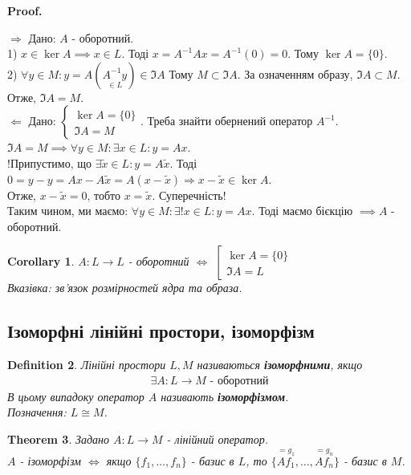 \documentclass[a4paper, 10pt]{article}
\makeatletter
\def\rightproof{$\boxed{\Rightarrow}$ }
\def\leftproof{$\boxed{\Leftarrow}$ }
\theoremstyle{theoremdd}
\newtheorem{theorem}{Theorem}[subsection]
\newtheorem{definition}[theorem]{Definition}
\newtheorem{corollary}[theorem]{Corollary}
\renewenvironment{proof}[1][Proof.\\]{\par
\pushQED{\hfill \qed}%
\normalfont \topsep6\p@\@plus6\p@\relax
\trivlist
\item\relax
{\bfseries
#1\@addpunct{.}}\hspace\labelsep\ignorespaces
}{%
\popQED\endtrivlist\@endpefalse
}
\makeatother
\begin{document}
	\begin{proof}
	\rightproof Дано: $A$ - оборотний.\\
	1) $x \in \ker A \implies x \in L$. Тоді $x = A^{-1}Ax = A^{-1}(0) = 0$. Тому $\ker A = \{0\}$.\\
	2) $\forall y \in M: y = A(\underset{\in L}{A^{-1}y}) \in \Im A$ Тому $M \subset \Im A$. За означенням образу, $\Im A \subset M$. Отже, $\Im A = M$.
	\bigskip \\
	\leftproof Дано: $\begin{cases} \ker A = \{0\} \\ \Im A = M \end{cases}$. Треба знайти обернений оператор $A^{-1}$.\\
	$\Im A = M \implies \forall y \in M: \exists x \in L: y = Ax$.\\
	!Припустимо, що $\exists \tilde{x} \in L: y = A\tilde{x}$. Тоді $0 = y - y = Ax - A\tilde{x} = A(x-\tilde{x}) \Rightarrow x-\tilde{x} \in \ker A$.\\
	Отже, $x-\tilde{x}=0$, тобто $x = \tilde{x}$. Суперечність!\\
	Таким чином, ми маємо: $\forall y \in M: \exists! x \in L: y = Ax$. Тоді маємо бієкцію $\implies A$ - оборотний.
	\end{proof}
	
	\begin{corollary}
	$A:L \to L$ - оборотний $\iff$ $\left[ \begin{gathered} \ker A = \{0\} \\ \Im A = L \end{gathered} \right.$\\
	\textit{Вказівка: зв'язок розмірностей ядра та образа}.
	\end{corollary}
	
	\subsection{Ізоморфні лінійні простори, ізоморфізм}
	\begin{definition}
	Лінійні простори $L,M$ називаються \textbf{ізоморфними}, якщо
	\begin{align*}
	\exists A: L \to M \text{ - оборотний}
	\end{align*}
	В цьому випадоку оператор $A$ називають \textbf{ізоморфізмом}.\\
	Позначення: $L \cong M$.
	\end{definition}
	
	\begin{theorem}
	Задано $A: L \to M$ - лінійний оператор.\\
	$A$ - ізоморфізм $\iff$ якщо $\{f_1,\dots,f_n\}$ - базис в $L$, то $\{\overset{=g_1}{Af_1},\dots, \overset{=g_n}{Af_n}\}$ - базис в $M$.
	\end{theorem}
	
\end{document}
